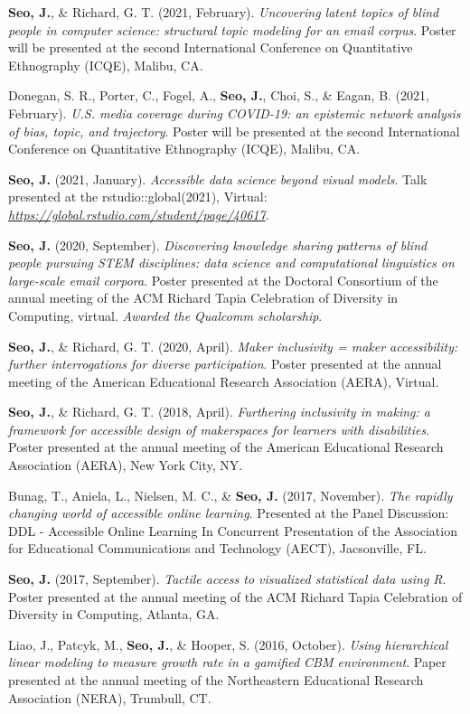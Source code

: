 \documentclass[11pt, a4paper]{awesome-cv}
\begin{document}
\textbf{Seo, J.}, \& Richard, G. T. (2021, February). \emph{Uncovering
latent topics of blind people in computer science: structural topic
modeling for an email corpus}. Poster will be presented at the second
International Conference on Quantitative Ethnography (ICQE), Malibu, CA.

Donegan, S. R., Porter, C., Fogel, A., \textbf{Seo, J.}, Choi, S., \&
Eagan, B. (2021, February). \emph{U.S. media coverage during COVID-19:
an epistemic network analysis of bias, topic, and trajectory}. Poster
will be presented at the second International Conference on Quantitative
Ethnography (ICQE), Malibu, CA.

\textbf{Seo, J.} (2021, January). \emph{Accessible data science beyond
visual models}. Talk presented at the rstudio::global(2021), Virtual:
\emph{\url{https://global.rstudio.com/student/page/40617}}.

\textbf{Seo, J.} (2020, September). \emph{Discovering knowledge sharing
patterns of blind people pursuing STEM disciplines: data science and
computational linguistics on large-scale email corpora}. Poster
presented at the Doctoral Consortium of the annual meeting of the ACM
Richard Tapia Celebration of Diversity in Computing, virtual.
\emph{Awarded the Qualcomm scholarship}.

\textbf{Seo, J.}, \& Richard, G. T. (2020, April). \emph{Maker
inclusivity = maker accessibility: further interrogations for diverse
participation}. Poster presented at the annual meeting of the American
Educational Research Association (AERA), Virtual.

\textbf{Seo, J.}, \& Richard, G. T. (2018, April). \emph{Furthering
inclusivity in making: a framework for accessible design of makerspaces
for learners with disabilities}. Poster presented at the annual meeting
of the American Educational Research Association (AERA), New York City,
NY.

Bunag, T., Aniela, L., Nielsen, M. C., \& \textbf{Seo, J.} (2017,
November). \emph{The rapidly changing world of accessible online
learning}. Presented at the Panel Discussion: DDL - Accessible Online
Learning In Concurrent Presentation of the Association for Educational
Communications and Technology (AECT), Jacsonville, FL.

\textbf{Seo, J.} (2017, September). \emph{Tactile access to visualized
statistical data using R}. Poster presented at the annual meeting of the
ACM Richard Tapia Celebration of Diversity in Computing, Atlanta, GA.

Liao, J., Patcyk, M., \textbf{Seo, J.}, \& Hooper, S. (2016, October).
\emph{Using hierarchical linear modeling to measure growth rate in a
gamified CBM environment}. Paper presented at the annual meeting of the
Northeastern Educational Research Association (NERA), Trumbull, CT.
\end{document}
